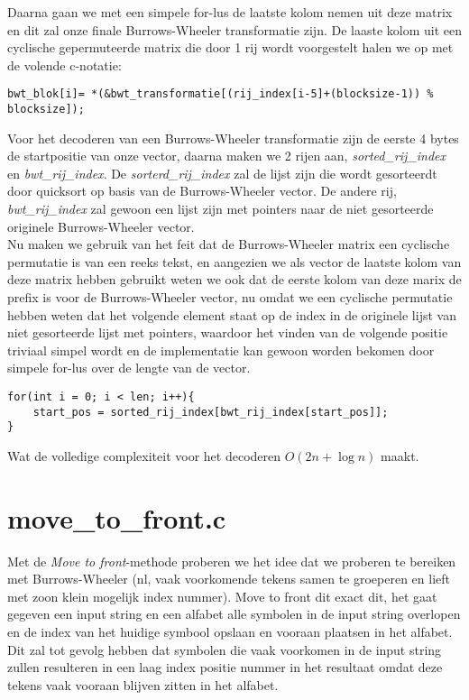 \documentclass[10pt,a4paper]{report}
\begin{document}
Daarna gaan we met een simpele for-lus de laatste kolom nemen uit deze matrix en dit zal onze finale Burrows-Wheeler transformatie zijn. De laaste kolom uit een cyclische gepermuteerde matrix die door 1 rij wordt voorgestelt halen we op met de volende c-notatie:
\begin{lstlisting}
bwt_blok[i]= *(&bwt_transformatie[(rij_index[i-5]+(blocksize-1)) % blocksize]);
\end{lstlisting}
Voor het decoderen van een Burrows-Wheeler transformatie zijn de eerste 4 bytes de startpositie van onze vector, daarna maken we 2 rijen aan, \emph{sorted\_rij\_index} en \emph{bwt\_rij\_index}. De \emph{sorterd\_rij\_index} zal de lijst zijn die wordt gesorteerdt door quicksort op basis van de Burrows-Wheeler vector. De andere rij, \emph{bwt\_rij\_index} zal gewoon een lijst zijn met pointers naar de niet gesorteerde originele Burrows-Wheeler vector. \\

Nu maken we gebruik van het feit dat de Burrows-Wheeler matrix een cyclische permutatie is van een reeks tekst, en aangezien we als vector de laatste kolom van deze matrix hebben gebruikt weten we ook dat de eerste kolom van deze marix de prefix is voor de Burrows-Wheeler vector, nu omdat we een cyclische permutatie hebben weten dat het volgende element staat op de index in de originele lijst van niet gesorteerde lijst met pointers, waardoor het vinden van de volgende positie triviaal simpel wordt en de implementatie kan gewoon worden bekomen door simpele for-lus over de lengte van de vector.
\begin{lstlisting}
for(int i = 0; i < len; i++){
	start_pos = sorted_rij_index[bwt_rij_index[start_pos]];
}
\end{lstlisting}
Wat de volledige complexiteit voor het decoderen $O(2n + \log n)$ maakt.
\section*{move\_to\_front.c}
Met de \emph{Move to front}-methode proberen we het idee dat we proberen te bereiken met Burrows-Wheeler (nl, vaak voorkomende tekens samen te groeperen en lieft met zoon klein mogelijk index nummer). Move to front dit exact dit, het gaat gegeven een input string en een alfabet alle symbolen in de input string overlopen en de index van het huidige symbool opslaan en vooraan plaatsen in het alfabet. Dit zal tot gevolg hebben dat symbolen die vaak voorkomen in de input string zullen resulteren in een laag index positie nummer in het resultaat omdat deze tekens vaak vooraan blijven zitten in het alfabet.\\
\end{document}
